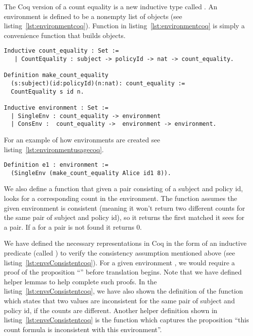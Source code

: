 The Coq version of a count equality is a new inductive type called . An environment is defined to be a nonempty list of  objects (see listing~\ref{lst:environmentcoq}). Function  in listing~\ref{lst:environmentcoq} is simply a convenience function that builds  objects. 

\begin{minipage}[c]{0.95\textwidth}
\begin{lstlisting}
Inductive count_equality : Set := 
   | CountEquality : subject -> policyId -> nat -> count_equality.

Definition make_count_equality
  (s:subject)(id:policyId)(n:nat): count_equality :=
  CountEquality s id n.
  
Inductive environment : Set := 
  | SingleEnv : count_equality -> environment
  | ConsEnv :  count_equality ->  environment -> environment.
\end{lstlisting}
\end{minipage}

For an example of how environments are created see listing~\ref{lst:environmentusagecoq}.

\begin{minipage}[c]{0.95\textwidth}
\begin{lstlisting}
Definition e1 : environment := 
  (SingleEnv (make_count_equality Alice id1 8)).
\end{lstlisting}
\end{minipage}
  

We also define a  function that given a pair consisting of a subject and policy id, looks for a corresponding count in the environment. The  function assumes the given environment is consistent (meaning it won't return two different counts for the same pair of subject and policy id), so it returns the first matched  it sees for a  pair. If a  for a  pair is not found it returns 0. 

We have defined the necessary representations in Coq in the form of an inductive predicate (called ) to verify the consistency assumption mentioned above (see listing~\ref{lst:envsConsistentcoq}). For a given environment , we would require a proof of the proposition ``'' before translation begins. Note that we have defined helper lemmas to help complete such proofs. In the listing~\ref{lst:envsConsistentcoq}, we have also shown the definition of the function  which states that two  values are inconsistent for the same pair of subject and policy id, if the counts are different. Another helper definition shown in listing~\ref{lst:envsConsistentcoq} is the function  which captures the proposition ``this count formula is inconsistent with this environment''.

